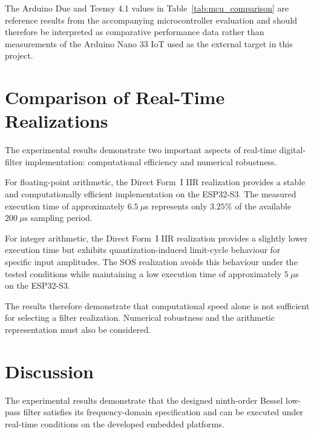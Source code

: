 The Arduino Due and Teensy 4.1 values in Table~\ref{tab:mcu_comparison} are
reference results from the accompanying microcontroller evaluation and should
therefore be interpreted as comparative performance data rather than
measurements of the Arduino Nano 33 IoT used as the external target in this
project.


\section{Comparison of Real-Time Realizations}
\label{sec:realization_comparison}

The experimental results demonstrate two important aspects of real-time
digital-filter implementation: computational efficiency and numerical
robustness.

For floating-point arithmetic, the Direct Form~I IIR realization provides a
stable and computationally efficient implementation on the ESP32-S3. The
measured execution time of approximately $6.5~\mu$s represents only $3.25\%$ of
the available $200~\mu$s sampling period.

For integer arithmetic, the Direct Form~I IIR realization provides a slightly
lower execution time but exhibits quantization-induced limit-cycle behaviour
for specific input amplitudes. The SOS realization avoids this behaviour under
the tested conditions while maintaining a low execution time of approximately
$5~\mu$s on the ESP32-S3.

The results therefore demonstrate that computational speed alone is not
sufficient for selecting a filter realization. Numerical robustness and the
arithmetic representation must also be considered.


\section{Discussion}
\label{sec:overall_result}

The experimental results demonstrate that the designed ninth-order Bessel
low-pass filter satisfies its frequency-domain specification and can be
executed under real-time conditions on the developed embedded platforms.

